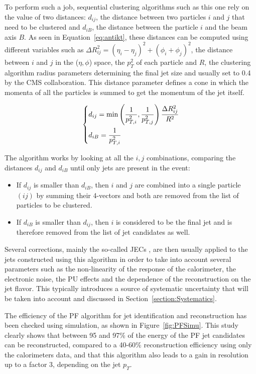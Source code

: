 \documentclass[a4paper, 10pt, openright]{report}
\begin{document}
To perform such a job, sequential clustering algorithms such as this one rely on the value of two distances: $d_{ij}$, the distance between two particles $i$ and $j$ that need to be clustered and $d_{iB}$, the distance between the particle $i$ and the beam axis $B$. As seen in Equation~\ref{eq:antikt}, these distances can be computed using different variables such as $\Delta R_{ij}^2 = (\eta_i - \eta_j)^2 + (\phi_i + \phi_j)^2$, the distance between $i$ and $j$ in the ($\eta, \phi$) space, the $p_T^2$ of each particle and $R$, the clustering algorithm radius parameters determining the final jet size and usually set to 0.4 by the \ac{CMS} collaboration. This distance parameter defines a cone in which the momenta of all the particles is summed to get the momentum of the jet itself.

\begin{equation}
\label{eq:antikt}
\begin{dcases}
d_{ij} = \text{min} \left (\frac{1}{p_{T, i}^2}, \frac{1}{p_{T, j}^2} \right ) \frac{\Delta R_{ij}^2}{R^2} \\
d_{iB} = \frac{1}{p_{T, i}^2}
\end{dcases}
\end{equation}

The algorithm works by looking at all the $i, j$ combinations, comparing the distances $d_{ij}$ and $d_{iB}$ until only jets are present in the event: 
\begin{itemize}
\item If $d_{ij}$ is smaller than $d_{iB}$, then $i$ and $j$ are combined into a single particle $(ij)$ by summing their 4-vectors and both are removed from the list of particles to be clustered.
\item If $d_{iB}$ is smaller than $d_{ij}$, then $i$ is considered to be the final jet and is therefore removed from the list of jet candidates as well.
\end{itemize}

Several corrections, mainly the so-called \acp{JEC} \cite{JEC}, are then usually applied to the jets constructed using this algorithm in order to take into account several parameters such as the non-linearity of the response of the calorimeter, the electronic noise, the \ac{PU} effects and the dependence of the reconstruction on the jet flavor. This typically introduces a source of systematic uncertainty that will be taken into account and discussed in Section~\ref{section:Systematics}.

The efficiency of the \ac{PF} algorithm for jet identification and reconstruction has been checked using simulation, as shown in Figure~\ref{fig:PFSimu}. This study clearly shows that between 95 and 97\% of the energy of the \ac{PF} jet candidates can be reconstructed, compared to a 40-60\% reconstruction efficiency using only the calorimeters data, and that this algorithm also leads to a gain in resolution up to a factor 3, depending on the jet $p_T$.
\end{document}
